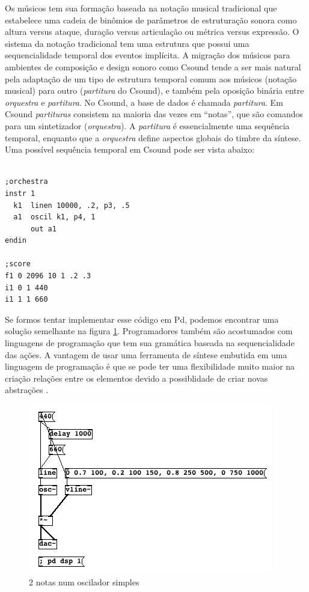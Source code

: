 \documentclass[draft]{ppgmus}
\begin{document}
Os músicos tem sua formação baseada na notação musical tradicional que
estabelece uma cadeia de binômios de parâmetros de estruturação sonora
\cite{zampronha00:notacao} como altura versus ataque, duração versus
articulação ou métrica versus expressão. O sistema da notação
tradicional tem uma estrutura que possui uma sequencialidade temporal
dos eventos implícita. A migração dos músicos para ambientes de
composição e design sonoro como Csound \cite{boulanger00:csound} tende
a ser mais natural pela adaptação de um tipo de estrutura temporal comum aos músicos
(notação musical) para outro (\textit{partitura} do Csound), e também pela oposição binária entre
\textit{orquestra} e \textit{partitura}. 
No Csound, a base de dados é chamada
\textit{partitura}. Em Csound \textit{partituras} consistem na maioria das vezes em
``notas'', que são comandos para um sintetizador (\textit{orquestra}). A \textit{partitura}
é essencialmente uma sequência temporal, enquanto que a \textit{orquestra}
define aspectos globais do timbre da síntese. Uma possível sequência
temporal em Csound pode ser vista abaixo:

\singlespacing
\begin{verbatim}

;orchestra
instr 1
  k1  linen 10000, .2, p3, .5
  a1  oscil k1, p4, 1
      out a1
endin

;score
f1 0 2096 10 1 .2 .3
i1 0 1 440
i1 1 1 660
\end{verbatim}

\doublespacing 

Se formos tentar implementar esse código em Pd, podemos encontrar uma 
solução semelhante na figura \ref{fig:exemplopd1}.
Programadores também são acostumados com linguagens de programação que
tem sua gramática baseada na sequencialidade das ações. A vantagem de
usar uma ferramenta de síntese embutida em uma linguagem de
programação é que se pode ter uma flexibilidade muito maior na criação
relações entre os elementos devido a possiblidade de criar novas
abstrações \cite{geiger2005}. 
 
\begin{figure}
  \centering
  \includegraphics[scale=.5]{exemplopd1}
  \caption{2 notas num oscilador simples}
  \label{fig:exemplopd1}
\end{figure}
\end{document}
